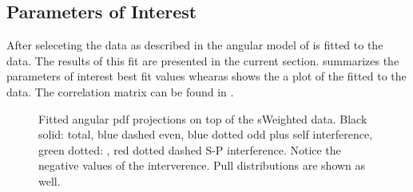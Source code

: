 \subsection{Parameters of Interest}
\label{Parameters_of_Interest}

After seleceting the data as described in  the angular model of  is fitted to the data.
The results of this fit are presented in the current section.  summarizes the parameters
of interest best fit values whearas  shows the a plot of the fitted \pdf to the \BsJpsiKst data. The correlation matrix
can be found in .


\begin{figure}[h]
\begin{center}
  \begin{subfigure}{0.5\textwidth}
    \scalebox{1.3}{}
    \caption{}
    \label{angPlot_ctk}
  \end{subfigure}%
  \hfill%
  \begin{subfigure}{0.5\textwidth}
    \scalebox{1.3}{}
    \caption{}
    \label{angPlot_ctl}
  \end{subfigure}
  \begin{subfigure}{0.5\textwidth}
    \scalebox{1.3}{}
    \caption{}
    \label{angPlot_phi}
  \end{subfigure}
  \caption{Fitted angular pdf projections on top of the \BsJpsiKst sWeighted data. 
           Black solid: total, blue dashed \pwave even, blue dotted \pwave odd plus \pwave self interference, 
           green dotted: \swave, red dotted dashed S-P interference. Notice the negative values of the \spwave interverence.
           Pull distributions are shown as well.}
  \label{angular_plot}
\end{center}
\end{figure}



